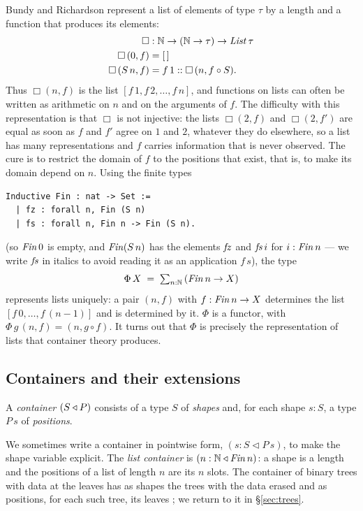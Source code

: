 \documentclass{fundam}
\begin{document}
Bundy and Richardson \cite{BundyRichardson99} represent a list of elements of type
$\tau$ by a length and a function that produces its elements:
\begin{align*}
  \Box &: \mathbb{N} \to (\mathbb{N} \to \tau) \to \mathit{List}\,\tau \\
  \Box\,(0, f) &= [\,] \\
  \Box\,(S\,n, f) &= f\,1 :: \Box\,(n, f \circ S).
\end{align*}
Thus $\Box(n, f)$ is the list $[f\,1, f\,2, \dots, f\,n]$, and functions on lists can
often be written as arithmetic on $n$ and on the arguments of $f$.  The difficulty with
this representation is that $\Box$ is not injective: the lists $\Box(2, f)$ and
$\Box(2, f')$ are equal as soon as $f$ and $f'$ agree on $1$ and $2$, whatever they do
elsewhere, so a list has many representations and $f$ carries information that is never
observed.  The cure is to restrict the domain of $f$ to the positions that exist, that is,
to make its domain depend on $n$.  Using the finite types
\begin{lstlisting}
Inductive Fin : nat -> Set :=
  | fz : forall n, Fin (S n)
  | fs : forall n, Fin n -> Fin (S n).
\end{lstlisting}
(so $\mathit{Fin}\,0$ is empty, and $\mathit{Fin}(S\,n)$ has the elements $\mathit{fz}$ and $\mathit{fs}\,i$ for
$i : \mathit{Fin}\,n$ --- we write $\mathit{fs}$ in italics to avoid reading it as an application
$f\,s$), the type
\[
  \Phi\,X \;=\; \textstyle\sum_{n:\mathbb{N}}\, (\mathit{Fin}\,n \to X)
\]
represents lists uniquely: a pair $(n, f)$ with $f : \mathit{Fin}\,n \to X$ determines the list
$[f\,0, \dots, f\,(n-1)]$ and is determined by it.  $\Phi$ is a functor, with
$\Phi\,g\,(n, f) = (n, g \circ f)$.  It turns out that $\Phi$ is precisely the
representation of lists that container theory produces.

\subsection{Containers and their extensions}

\begin{definition}[Container]\label{def:container}
  A \emph{container} $(S \triangleleft P)$ consists of a type $S$ of \emph{shapes} and, for each
  shape $s : S$, a type $P\,s$ of \emph{positions}.
\end{definition}

We sometimes write a container in pointwise form, $(s : S \triangleleft P\,s)$, to make
the shape variable explicit.  The \emph{list container} is
$(n : \mathbb{N} \triangleleft \mathit{Fin}\,n)$: a shape is a length and the positions of a list of
length $n$ are its $n$ slots.  The container of binary trees with data at the leaves has
as shapes the trees with the data erased and as positions, for each such tree, its leaves
\cite{AbbottAltenkirchGhaniMcBride04}; we return to it in \S\ref{sec:trees}.
\end{document}
